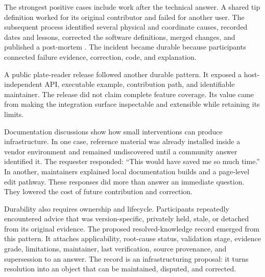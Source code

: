 The strongest positive cases include work after the technical answer. A shared tip definition worked for its original contributor and failed for another user. The subsequent process identified several physical and coordinate causes, recorded dates and lessons, corrected the software definitions, merged changes, and published a post-mortem \cite{forum_tip_postmortem}. The incident became durable because participants connected failure evidence, correction, code, and explanation.

A public plate-reader release followed another durable pattern. It exposed a host-independent API, executable example, contribution path, and identifiable maintainer. The release did not claim complete feature coverage. Its value came from making the integration surface inspectable and extensible while retaining its limits.

Documentation discussions show how small interventions can produce infrastructure. In one case, reference material was already installed inside a vendor environment and remained undiscovered until a community answer identified it. The requester responded: ``This would have saved me so much time.'' \cite{forum_hsl_learning} In another, maintainers explained local documentation builds and a page-level edit pathway. These responses did more than answer an immediate question. They lowered the cost of future contribution and correction.

Durability also requires ownership and lifecycle. Participants repeatedly encountered advice that was version-specific, privately held, stale, or detached from its original evidence. The proposed resolved-knowledge record emerged from this pattern. It attaches applicability, root-cause status, validation stage, evidence grade, limitations, maintainer, last verification, source provenance, and supersession to an answer. The record is an infrastructuring proposal: it turns resolution into an object that can be maintained, disputed, and corrected.
